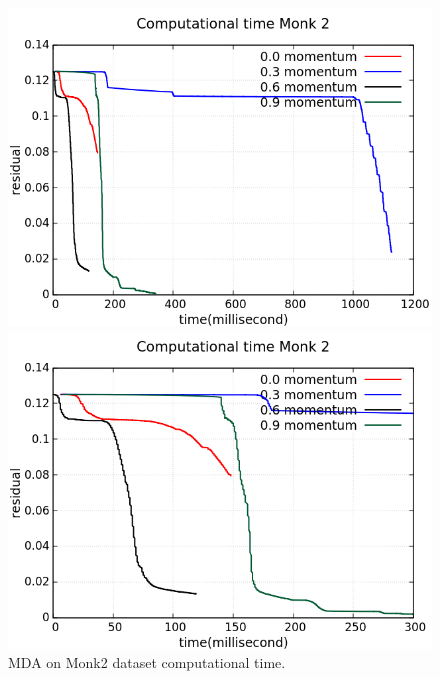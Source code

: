 \begin{figure}[H]
	\centering
	\begin{minipage}[t]{0.5\linewidth}
		\includegraphics[width=\linewidth]{data/MGD/Monk2/M/Monk2_MGD_CT_standard.png}
	\end{minipage}%
	\begin{minipage}[t]{0.5\linewidth}
		\includegraphics[width=\linewidth]{data/MGD/Monk2/M/Monk2_MGD_CT_zoom.png}
	\end{minipage}
	\caption{MDA on Monk2 dataset computational time.}
\end{figure}
